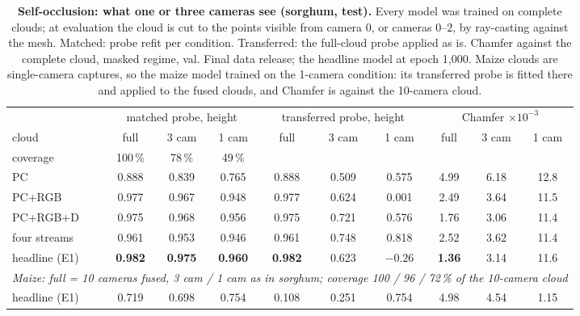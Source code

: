 \begin{table}[t]
  \centering\scriptsize
  \setlength{\tabcolsep}{3.4pt}
  \begin{tabular}{l ccc ccc ccc}
    \toprule
    & \multicolumn{3}{c}{matched probe, height} & \multicolumn{3}{c}{transferred probe, height} & \multicolumn{3}{c}{Chamfer $\times10^{-3}$} \\
    \cmidrule(lr){2-4}\cmidrule(lr){5-7}\cmidrule(lr){8-10}
    cloud & full & 3 cam & 1 cam & full & 3 cam & 1 cam & full & 3 cam & 1 cam \\
    coverage & 100\,\% & 78\,\% & 49\,\% & & & & & & \\
    \midrule
    PC             & 0.888 & 0.839 & 0.765 & 0.888 & 0.509 & 0.575 & 4.99 & 6.18 & 12.8 \\
    PC+RGB         & 0.977 & 0.967 & 0.948 & 0.977 & 0.624 & 0.001 & 2.49 & 3.64 & 11.5 \\
    PC+RGB+D       & 0.975 & 0.968 & 0.956 & 0.975 & 0.721 & 0.576 & 1.76 & 3.06 & 11.4 \\
    four streams   & 0.961 & 0.953 & 0.946 & 0.961 & 0.748 & 0.818 & 2.52 & 3.62 & 11.4 \\
    headline (E1)  & \textbf{0.982} & \textbf{0.975} & \textbf{0.960} & \textbf{0.982} & 0.623 & $-0.26$ & \textbf{1.36} & 3.14 & 11.6 \\
    \midrule
    \multicolumn{10}{l}{\emph{Maize: full = 10 cameras fused, 3 cam / 1 cam as in sorghum; coverage 100 / 96 / 72\,\% of the 10-camera cloud}} \\
    headline (E1)  & 0.719 & 0.698 & 0.754 & 0.108 & 0.251 & 0.754 & 4.98 & 4.54 & 1.15 \\
    \bottomrule
  \end{tabular}
  \caption{\textbf{Self-occlusion: what one or three cameras see (sorghum,
  test).} Every model was trained on complete clouds; at evaluation the cloud is
  cut to the points visible from camera 0, or cameras 0--2, by ray-casting
  against the mesh. Matched: probe refit per condition. Transferred: the
  full-cloud probe applied as is. Chamfer against the complete cloud, masked
  regime, val. Final data release; the headline model at epoch 1{,}000. Maize
  clouds are single-camera captures, so the maize model trained on the 1-camera
  condition: its transferred probe is fitted there and applied to the fused
  clouds, and Chamfer is against the 10-camera cloud.}
  \label{tab:views}
\end{table}

